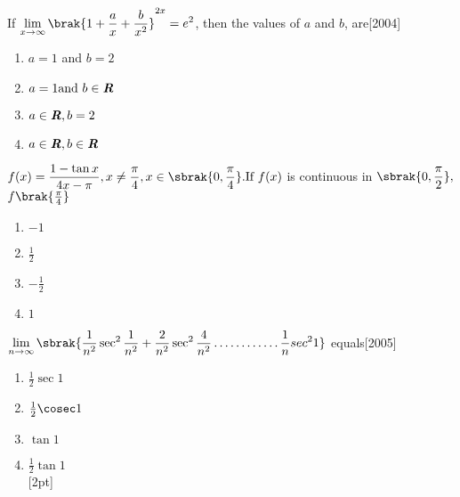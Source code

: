 \item If $\displaystyle \lim\limits_{x\to\infty}\brak{1+\frac{a}{x}+\frac{b}{x^2}}^{2x}=e^2$, then the values of $a$ and $b$, are\hfill [2004]\\
\begin{enumerate}
    \item{$a=1$ and $b=2$}
    \item{$a=1 \text{and }b\in \textbf{\textit{R}}$}
    \item{$a\in \textbf{\textit{R}},b=2$}
    \item{$a\in \textbf{\textit{R}},b\in \textbf{\textit{R}}$}\\[2pt]
\end{enumerate}
\item $\displaystyle f(x)=\frac{1-\tan x}{4x-\pi}, x\neq\frac{\pi}{4},x\in\sbrak{0,\frac{\pi}{4}}\text{.If }f(x)$ is continuous in $\displaystyle\sbrak{0,\frac{\pi}{2}},$$f\brak{\frac{\pi}{4}}$\\
\begin{enumerate}
    \item{$-1$}
    \item{$\frac{1}{2}$}
    \item{$-\frac{1}{2}$}
    \item{$1$}\\[2pt]
\end{enumerate}
\item $\displaystyle\lim\limits_{n\to\infty}\sbrak{\frac{1}{n^2}\sec^2\frac{1}{n^2}+\frac{2}{n^2}\sec^2\frac{4}{n^2}\dots\dots\dots\dots\frac{1}{n}sec^2 1}$ equals\hfill[2005]\\
\begin{enumerate}

    \item{$\frac{1}{2}\sec 1$}
    \item{$\frac{1}{2}\cosec 1$}
    \item{$\tan 1$}
    \item{$\frac{1}{2} \tan 1$\\}[2pt]
\end{enumerate}

